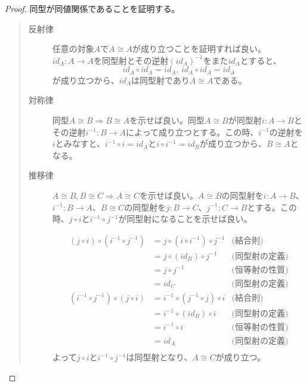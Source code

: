 \documentclass[uplatex,dvipdfmx]{jsarticle}
\newcommand{\arrow}{\rightarrow}
\newcommand{\mor}[3]{#1:#2\arrow #3}
\newtheorem{proof}{証明}[section]
\numberwithin{proof}{subsection}
\numberwithin{prop}{subsection}
\numberwithin{define}{subsection}
\begin{document}
  \begin{proof}
    同型が同値関係であることを証明する。
    \begin{quote}
			\begin{description}
				\item[反射律] 任意の対象$A$で$A\cong A$が成り立つことを証明すれば良い。$\mor{id_A}{A}{A}$を同型射とその逆射$(id_A)^{-1}$をまた$id_A$とすると、\[id_A\circ id_A = id_A,\,id_A\circ id_A = id_A\]が成り立つから、$id_A$は同型射であり$A\cong A$である。

				\item[対称律] 同型$A\cong B\Longrightarrow B\cong A$を示せば良い。同型$A\cong B$が同型射$\mor{i}{A}{B}$とその逆射$\mor{i^{-1}}{B}{A}$によって成り立つとする。この時、$i^{-1}$の逆射を$i$とみなすと、$i^{-1}\circ i=id_A$と$i\circ i^{-1}=id_B$が成り立つから、$B\cong A$となる。
				\item[推移律] $A\cong B,B\cong C\Longrightarrow A\cong C$を示せば良い。$A\cong B$の同型射を$\mor{i}{A}{B}$、$\mor{i^{-1}}{B}{A}$、$B\cong C$の同型射を$\mor{j}{B}{C}$、$\mor{j^{-1}}{C}{B}$とする。この時、$j\circ i$と$i^{-1}\circ j^{-1}$が同型射になることを示せば良い。
        \begin{center}
        \end{center} 
				\begin{align*}
          (j\circ i)\circ (i^{-1}\circ j^{-1})&=j\circ(i\circ i^{-1})\circ j^{-1}&\text{(結合則)}\\
          &=j\circ(id_B)\circ j^{-1}&\text{(同型射の定義)}\\
          &=j\circ j^{-1}&\text{(恒等射の性質)}\\
          &=id_C&\text{(同型射の定義)}\\
          (i^{-1}\circ j^{-1})\circ(j\circ i)&=i^{-1}\circ(j^{-1}\circ j)\circ i&\text{(結合則)}\\
          &=i^{-1}\circ(id_B)\circ i&\text{(同型射の定義)}\\
          &=i^{-1}\circ i&\text{(恒等射の性質)}\\
          &=id_A&\text{(同型射の定義)}\\
        \end{align*}
        よって$j\circ i$と$i^{-1}\circ j^{-1}$は同型射となり、$A\cong C$が成り立つ。
      \end{description}
    \end{quote}
  \end{proof}
\end{document}

